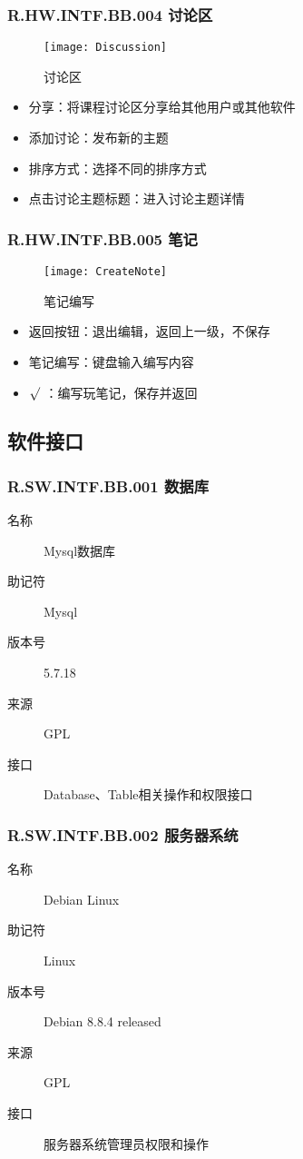   \subsubsection{R.HW.INTF.BB.004 讨论区}
    \begin{figure}[H]
    \centering
    \texttt{[image: Discussion]}
    \caption{讨论区}
    \end{figure}
  \begin{itemize}
  \item 分享：将课程讨论区分享给其他用户或其他软件
  \item 添加讨论：发布新的主题
  \item 排序方式：选择不同的排序方式
  \item 点击讨论主题标题：进入讨论主题详情
  \end{itemize}
  \subsubsection{R.HW.INTF.BB.005 笔记}
  \begin{figure}[H]
  \centering
  \texttt{[image: CreateNote]}
  \caption{笔记编写}
  \end{figure}
  \begin{itemize}
  \item 返回按钮：退出编辑，返回上一级，不保存
  \item 笔记编写：键盘输入编写内容
  \item $\surd$ ：编写玩笔记，保存并返回
  \end{itemize}

  \subsection{软件接口}
    \subsubsection{R.SW.INTF.BB.001 数据库}
	   \begin{description}
      \item[名称] Mysql数据库
      \item[助记符] Mysql
      \item[版本号]5.7.18
	     \item[来源] GPL
	      \item[接口] Database、Table相关操作和权限接口
	     \end{description}

    \subsubsection{R.SW.INTF.BB.002 服务器系统}
    \begin{description}
      \item[名称] Debian Linux
      \item[助记符] Linux
      \item[版本号] Debian 8.8.4 released
      \item[来源] GPL
      \item[接口] 服务器系统管理员权限和操作
    \end{description}

